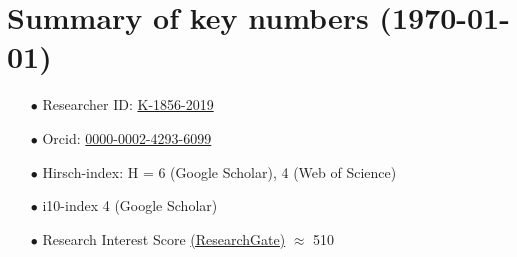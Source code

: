 \documentclass[11pt,a4paper,roman,english,colorlinks,linkcolor=true]{moderncv}
\begin{document}
\section{\textbf{Summary of key numbers (\today)}}
\begin{enumerate}[leftmargin=2.5cm]
	\item[$\bullet$] Researcher ID: \href{https://www.webofscience.com/wos/author/record/K-1856-2019}{K-1856-2019}
	\item[$\bullet$] Orcid: \href{https://orcid.org/0000-0002-4293-6099}{0000-0002-4293-6099}
	\item[$\bullet$] Hirsch-index: H = 6 (Google Scholar), 4 (Web of Science)
	\item[$\bullet$] i10-index 4 (Google Scholar)
	\item[$\bullet$] Research Interest Score \href{https://www.researchgate.net/profile/Vatsal-Sanjay-2}{(ResearchGate)} $\approx$ 510
	 
\end{enumerate}
\end{document}
